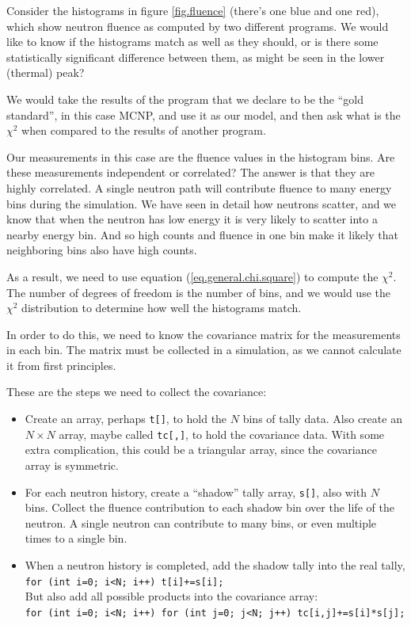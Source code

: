 \documentclass[letterpaper,12pt]{article}
\begin{document}
Consider the histograms in figure \ref{fig.fluence} (there's one blue and one red), which show neutron fluence as computed by two different programs. We would like to know if the histograms match as well as they should, or is there some statistically significant difference between them, as might be seen in the lower (thermal) peak? 

We would take the results of the program that we declare to be the ``gold standard'', in this case MCNP, and use it as our model, and then ask what is the $\chi^2$ when compared to the results of another program.

Our measurements in this case are the fluence values in the histogram bins. Are these measurements independent or correlated? The answer is that they are highly correlated. A single neutron path will contribute fluence to many energy bins during the simulation. We have seen in detail how neutrons scatter, and we know that when the neutron has low energy it is very likely to scatter into a nearby energy bin. And so high counts and fluence in one bin make it likely that neighboring bins also have high counts.

As a result, we need to use equation (\ref{eq.general.chi.square}) to compute the $\chi^2$. The number of degrees of freedom is the number of bins, and we would use the $\chi^2$ distribution to determine how well the histograms match.

In order to do this, we need to know the covariance matrix for the measurements in each bin.  The matrix must be collected in a simulation, as we cannot calculate it from first principles.

These are the steps we need to collect the covariance:

\begin{itemize}
	\item Create an array, perhaps \texttt{t[]}, to hold the $N$ bins of tally data. Also create an $N\times N$ array, maybe called \texttt{tc[,]}, to hold the covariance data. With some extra complication, this could be a triangular array, since the covariance array is symmetric.
	\item For each neutron history, create a ``shadow'' tally array, \texttt{s[]}, also with $N$ bins. Collect the fluence contribution to each shadow bin over the life of the neutron. A single neutron can contribute to many bins, or even multiple times to a single bin.
	\item When a neutron history is completed, add the shadow tally into the real tally,\\
	\texttt{for (int i=0; i<N; i++) t[i]+=s[i];} \\
	But also add all possible products into the covariance array:\\ 
	\texttt{for (int i=0; i<N; i++) for (int j=0; j<N; j++) tc[i,j]+=s[i]*s[j];} 
\end{itemize}
\end{document}

